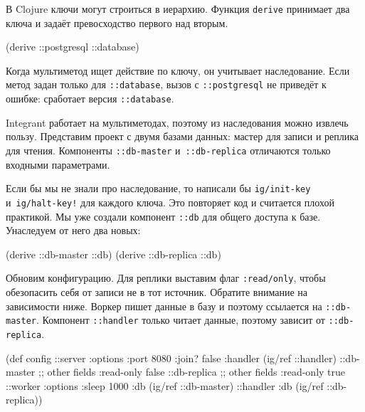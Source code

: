 
В Clojure ключи могут строиться в иерархию. Функция \verb|derive| принимает
два ключа и задаёт превосходство первого над вторым.


\begin{english}
  \begin{clojure}
(derive ::postgresql ::database)
  \end{clojure}
\end{english}

Когда мультиметод ищет действие по ключу, он учитывает наследование. Если метод
задан только для \verb|::database|, вызов с \verb|::postgresql| не приведёт к
ошибке: сработает версия \verb|::database|.

Integrant работает на мультиметодах, поэтому из наследования можно извлечь
пользу. Представим проект с двумя базами данных: мастер для записи и реплика для
чтения. Компоненты \verb|::db-master| и~\verb|::db-replica| отличаются только
входными параметрами.

Если бы мы не знали про наследование, то написали бы \verb|ig/init-key|
и~\verb|ig/halt-key!| для каждого ключа. Это повторяет код и считается плохой
практикой. Мы уже создали компонент \verb|::db| для общего доступа к
базе. Унаследуем от него два новых:

\begin{english}
  \begin{clojure}
(derive ::db-master ::db)
(derive ::db-replica ::db)
  \end{clojure}
\end{english}

Обновим конфигурацию. Для реплики выставим флаг \texttt{:read\-/only}, чтобы
обезопасить себя от записи не в тот источник. Обратите внимание на зависимости
ниже. Воркер пишет данные в базу и поэтому ссылается на
\verb|::db-master|. Компонент \verb|::handler| только читает данные,
поэтому зависит от \verb|::db-replica|.

\ifnarrow

\begin{english}
  \begin{clojure}
(def config
  {::server {:options {:port 8080
                       :join? false}
             :handler (ig/ref ::handler)}
   ::db-master {;; other fields
                :read-only false}
   ::db-replica {;; other fields
                 :read-only true}
   ::worker {:options {:sleep 1000}
             :db (ig/ref ::db-master)}
   ::handler {:db (ig/ref
                    ::db-replica)}})
  \end{clojure}
\end{english}

